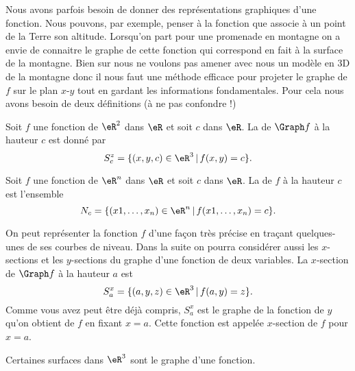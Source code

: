 Nous avons parfois besoin de donner des représentations graphiques d'une fonction. Nous pouvons, par exemple, penser à la fonction que associe à un point de la Terre son altitude. Lorsqu'on part pour une promenade en montagne on a envie de connaitre le graphe de cette fonction qui correspond en fait à la surface de la montagne. Bien sur nous ne voulons pas amener avec nous un modèle en 3D de la montagne donc il nous faut une méthode efficace pour projeter le graphe de \( f\) sur le plan \( x\)-\( y\) tout en gardant les informations fondamentales. Pour cela nous avons besoin de deux définitions (à ne pas confondre !)
\begin{definition}
	Soit \( f\) une fonction de \( \eR^2\) dans \( \eR\) et soit \( c\) dans \( \eR\).  La  de \( \Graph f\) à la hauteur \( c\) est donné par
	\[
		S^z_c=\{ (x,y,c)\in \eR^3\,|\, f(x,y)=c\}.
	\]
\end{definition}

\begin{definition}\label{def_niveau}
	Soit \( f\) une fonction de \( \eR^n\) dans \( \eR\) et soit \( c\) dans \( \eR\). La  de \( f\) à la hauteur \( c\) est l'ensemble
	\begin{equation}
		N_c=\{ (x1,\ldots, x_n)\in \eR^n\,|\, f(x1,\ldots, x_n)=c\}.
	\end{equation}
\end{definition}
On peut représenter la fonction \( f\) d'une façon très précise en traçant quelques-unes de ses courbes de niveau.  Dans la suite on pourra considérer aussi les \( x\)-sections et les \( y\)-sections du graphe d'une fonction de deux variables. La \( x\)-section de \( \Graph f\) à la hauteur \( a\) est
\[
	S^x_a=\{(a,y,z)\in\eR^3\,|\, f(a,y)=z\}.
\]
Comme vous avez peut être déjà compris, \( S^x_a\) est le graphe de la fonction de \( y\) qu'on obtient de \( f\) en fixant \( x=a\). Cette fonction est appelée \( x\)-section de \( f\) pour \( x=a\).

Certaines surfaces dans \( \eR^3\) sont le graphe d'une fonction.

